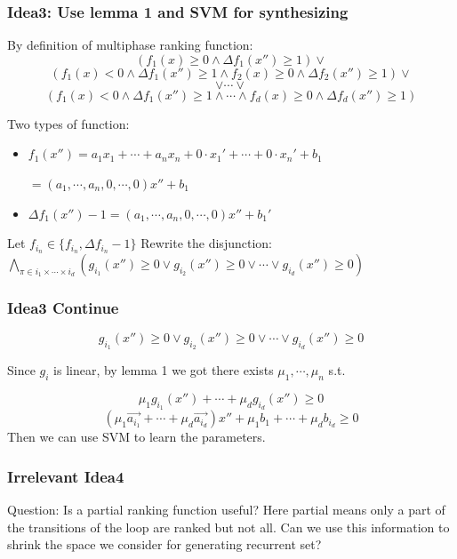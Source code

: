 \documentclass[10pt]{beamer}
\begin{document}


\begin{frame}\frametitle{Idea3: Use lemma 1 and SVM for synthesizing}
By definition of multiphase ranking function:
\[(f_1(x) \ge 0 \wedge \Delta f_1(x'') \ge 1 ) \vee \]
\[(f_1(x) < 0 \wedge \Delta f_1(x'') \ge 1 \wedge f_2(x) \ge 0 \wedge \Delta f_2(x'') \ge 1)\vee\]
\[\vee\cdots\vee\]
\[(f_1(x) < 0 \wedge \Delta f_1(x'') \ge 1 \wedge \cdots \wedge f_d(x) \ge 0 \wedge \Delta f_d(x'') \ge 1)\]

Two types of function: 
\begin{itemize}
\item $f_1(x'') = a_1x_1 + \cdots + a_nx_n + 0\cdot x_1' + \cdots + 0\cdot x_n' + b_1$

$ = (a_1, \cdots ,a_n, 0, \cdots, 0)x'' + b_1$
\item $\Delta f_1(x'') - 1 = (a_1, \cdots, a_n, 0, \cdots, 0) x'' + b_1'$
\end{itemize}

Let $f_{i_n} \in \{f_{i_n}, \Delta f_{i_n} - 1\}$ Rewrite the disjunction:
$\bigwedge_{\pi \in i_1 \times \cdots \times i_d} (g_{i_1}(x'') \ge 0 \vee g_{i_2}(x'') \ge 0 \vee \cdots \vee g_{i_d}(x'') \ge 0 )$
\end{frame}

\begin{frame}\frametitle{Idea3 Continue}
\[g_{i_1}(x'') \ge 0 \vee g_{i_2}(x'') \ge 0 \vee \cdots \vee g_{i_d}(x'') \ge 0 \]

Since $g_i$ is linear, by lemma 1 we got there exists $\mu_1, \cdots, \mu_n$ s.t.

\[\mu_1 g_{i_1}(x'') + \cdots + \mu_d g_{i_d}(x'') \ge 0\]
\[(\mu_1\vec{a_{i_1}} + \cdots + \mu_d \vec{a_{i_d}}) x'' + \mu_1 b_1 + \cdots + \mu_d b_{i_d} \ge 0\]
Then we can use SVM to learn the parameters.

\end{frame}

\begin{frame}\frametitle{Irrelevant Idea4}
Question: Is a partial ranking function useful? Here partial means only a part of the transitions of the loop are ranked but not all. Can we use this information to shrink the space we consider for generating recurrent set?



\end{frame}
\end{document}
